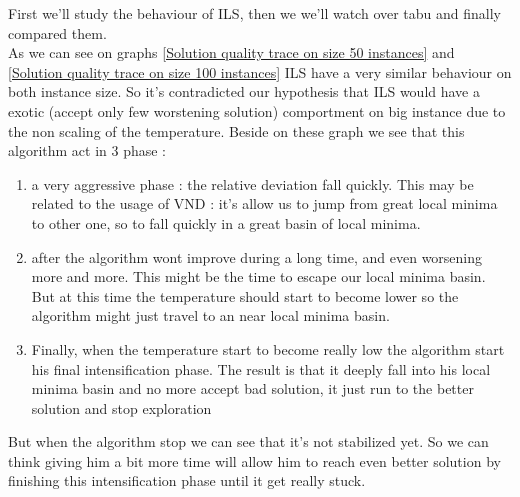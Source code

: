 \documentclass[12pt,a4paper]{article}
\begin{document}
First we'll study the behaviour of ILS, then we we'll watch over tabu and finally compared them.\\

As we can see on graphs \ref{Solution quality trace on size 50 instances} and \ref{Solution quality trace on size 100 instances} ILS have a very similar behaviour on both instance size. So it's contradicted our hypothesis that ILS would have a exotic (accept only few worstening solution) comportment on big instance due to the non scaling of the temperature. Beside on these graph we see that this algorithm act in 3 phase :
\begin{enumerate}[1 - ]
\item
a very aggressive phase : the relative deviation fall quickly. This may be related to the usage of VND : it's allow us to jump from great local minima to other one, so to fall quickly in a great basin of local minima.
\item
after the algorithm wont improve during a long time, and even worsening more and more. This might be the time to escape our local minima basin. But at this time the temperature should start to become lower so the algorithm might just travel to an near local minima basin.
\item
Finally, when the temperature start to become really low the algorithm start his final intensification phase. The result is that it deeply fall into his local minima basin and no more accept bad solution, it just run to the better solution and stop exploration
\end{enumerate}
But when the algorithm stop we can see that it's not stabilized yet. So we can think giving him a bit more time will allow him to reach even better solution by finishing this intensification phase until it get really stuck.
\end{document}
